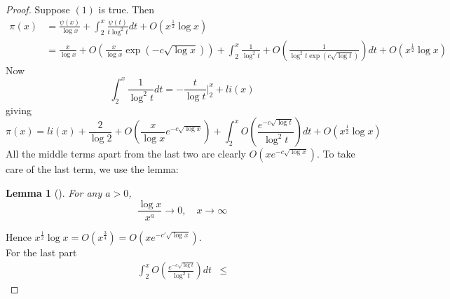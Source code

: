 \documentclass[reqno]{amsart}
\newtheorem{lemma}[theorem]{Lemma}
\theoremstyle{definition}
\theoremstyle{remark}
\begin{document}
\begin{proof}
    Suppose $(1)$ is true. Then
    \begin{align*}
        \pi(x) 
        &=
    \frac{\psi (x)}{\log x} + \int_{2}^{x} 
    \frac{\psi (t)}{t \log^2 t} dt + O \left( x^{\frac{1}{2}}
    \log x\right)\\
        &= \frac{x}{\log x} + O\left( \frac{x}{\log x}
        \exp\left( -c \sqrt{\log x}  \right) \right) 
        + \int_{2}^{x} \frac{1}{\log^2 t} 
        + O\left( \frac{1}{\log^2 t \exp\left( c \sqrt{\log t} 
        \right) } \right) dt
        + O\left( x^{\frac{1}{2}} \log x \right) 
    \end{align*}
    Now
    \[
    \int_{2}^{x} \frac{1}{\log^2 t} dt
    = - \frac{t}{\log t} \bigg|_{2}^{x} 
    + li(x) 
    \] 
    giving
    \[
    \pi(x) = li(x) + \frac{2}{\log 2}
    + O\left( \frac{x}{\log x} e^{-c \sqrt{\log x} } \right) 
    + \int_{2}^{x} 
    O\left( \frac{e^{- c \sqrt{\log t} }}{\log^2 t } \right) dt
    + O \left( x^{\frac{1}{2}} \log x \right) 
    \] 
    All the middle terms apart from the
    last two are clearly
    $O \left( x e^{-c \sqrt{\log x} } \right) $.
    To take care of the last term, we use the lemma:
    \begin{lemma}[]
        For any $a > 0$,
        \[
        \frac{\log x}{x^{a}} \to 0, \quad x \to \infty
        \] 
    \end{lemma}
    Hence
    $x^{\frac{1}{2}} \log x 
    = O\left( x^{\frac{3}{4}} \right) 
    = O\left( x e^{-c' \sqrt{\log x} } \right) $.\\

    For the last part
    \begin{align*}
        \int_{2}^{x} O \left( \frac{e^{-c \sqrt{\log t} }}{\log^2 t}
        \right)dt
        &\le 
    \end{align*}



\end{proof}
\end{document}
